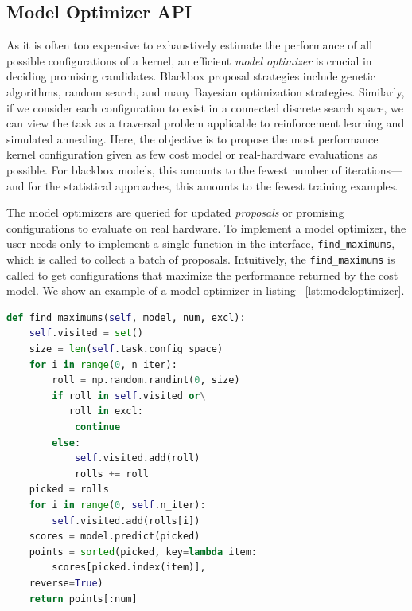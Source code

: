 \subsection{Model Optimizer API}
As it is often too expensive to exhaustively estimate the performance of all possible configurations of a  kernel, an efficient \emph{model optimizer} is crucial in deciding promising candidates.
Blackbox proposal strategies include genetic algorithms, random search, and many Bayesian optimization strategies.
Similarly, if we consider each configuration to exist in a connected discrete search space, we can view the task as a traversal problem applicable to reinforcement learning and simulated annealing.
Here, the objective is to propose the most performance kernel configuration given as few cost model or real-hardware evaluations as possible.
For blackbox models, this amounts to the fewest number of iterations---and for the statistical approaches, this amounts to the fewest training examples.

The model optimizers are queried for updated \emph{proposals} or promising configurations to evaluate on real hardware.
To implement a model optimizer, the user needs only to implement a single function in the interface, \texttt{find\_maximums}, which is called to collect a batch of proposals.
Intuitively, the \texttt{find\_maximums} is called to get configurations that maximize the performance returned by the cost model.
We show an example of a model optimizer in listing ~\autoref{lst:modeloptimizer}.
%
\begin{lstlisting}[caption={Simple example of a naive random model optimizer. A reference to a cost model is passed as \emph{model}, the number of proposals is specified with \emph{num}, and \emph{excl} contains a set of any points in the search space that should be excluded from consideration.},label={lst:modeloptimizer},language=Python,float,floatplacement=H]
def find_maximums(self, model, num, excl):
    self.visited = set()
    size = len(self.task.config_space)
    for i in range(0, n_iter):
        roll = np.random.randint(0, size)
        if roll in self.visited or\
           roll in excl:
            continue
        else:
            self.visited.add(roll)
            rolls += roll 
    picked = rolls
    for i in range(0, self.n_iter):
        self.visited.add(rolls[i])
    scores = model.predict(picked)
    points = sorted(picked, key=lambda item: 
        scores[picked.index(item)],
    reverse=True)
    return points[:num]
\end{lstlisting}

